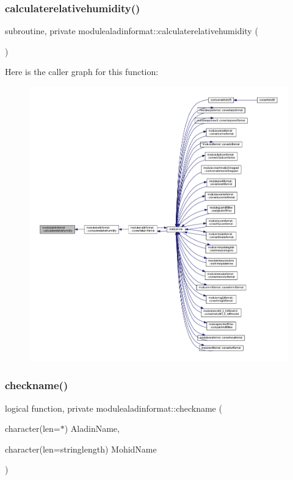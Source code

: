 \subsubsection{\texorpdfstring{calculaterelativehumidity()}{calculaterelativehumidity()}}
{\footnotesize\ttfamily subroutine, private modulealadinformat\+::calculaterelativehumidity (\begin{DoxyParamCaption}{ }\end{DoxyParamCaption})\hspace{0.3cm}{\ttfamily [private]}}

Here is the caller graph for this function\+:\nopagebreak
\begin{figure}[H]
\begin{center}
\leavevmode
\includegraphics[width=350pt]{namespacemodulealadinformat_a1c17164c3687aa7b8257c842cf0ad32a_icgraph}
\end{center}
\end{figure}
\mbox{\label{namespacemodulealadinformat_ad07bce7e401d49446a1fcfabb4bb4fa8}} 
\subsubsection{\texorpdfstring{checkname()}{checkname()}}
{\footnotesize\ttfamily logical function, private modulealadinformat\+::checkname (\begin{DoxyParamCaption}\item[{character(len=$\ast$)}]{Aladin\+Name,  }\item[{character(len=stringlength)}]{Mohid\+Name }\end{DoxyParamCaption})\hspace{0.3cm}{\ttfamily [private]}}

